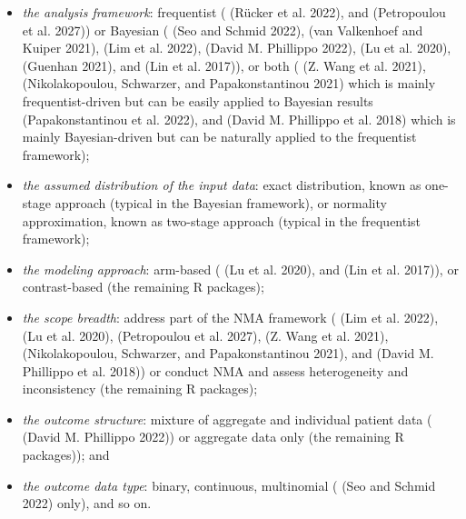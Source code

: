 \begin{itemize}
\tightlist
\item
  \emph{the analysis framework}: frequentist ( (Rücker et al. 2022), and
   (Petropoulou et al. 2027)) or Bayesian ( (Seo and Schmid 2022),
   (van Valkenhoef and Kuiper 2021),  (Lim et al. 2022),  (David M. Phillippo 2022),  (Lu et al. 2020),  (Guenhan 2021), and 
  (Lin et al. 2017)), or both ( (Z. Wang et al. 2021), 
  (Nikolakopoulou, Schwarzer, and Papakonstantinou 2021) which is mainly frequentist-driven but can be easily applied to Bayesian
  results (Papakonstantinou et al. 2022), and  (David M. Phillippo et al. 2018) which is
  mainly Bayesian-driven but can be naturally applied to the frequentist framework);
\item
  \emph{the assumed distribution of the input data}: exact distribution, known as one-stage
  approach (typical in the Bayesian framework), or normality approximation, known as
  two-stage approach (typical in the frequentist framework);
\item
  \emph{the modeling approach}: arm-based ( (Lu et al. 2020), and  (Lin et al. 2017)), or contrast-based (the remaining R packages);
\item
  \emph{the scope breadth}: address part of the NMA framework ( (Lim et al. 2022),  (Lu et al. 2020),  (Petropoulou et al. 2027),
   (Z. Wang et al. 2021),  (Nikolakopoulou, Schwarzer, and Papakonstantinou 2021), and  (David M. Phillippo et al. 2018)) or conduct NMA and assess heterogeneity and inconsistency
  (the remaining R packages);
\item
  \emph{the outcome structure}: mixture of aggregate and individual patient data
  ( (David M. Phillippo 2022)) or aggregate data only (the remaining R
  packages)); and
\item
  \emph{the outcome data type}: binary, continuous, multinomial ( (Seo and Schmid 2022) only),
  and so on.
\end{itemize}

